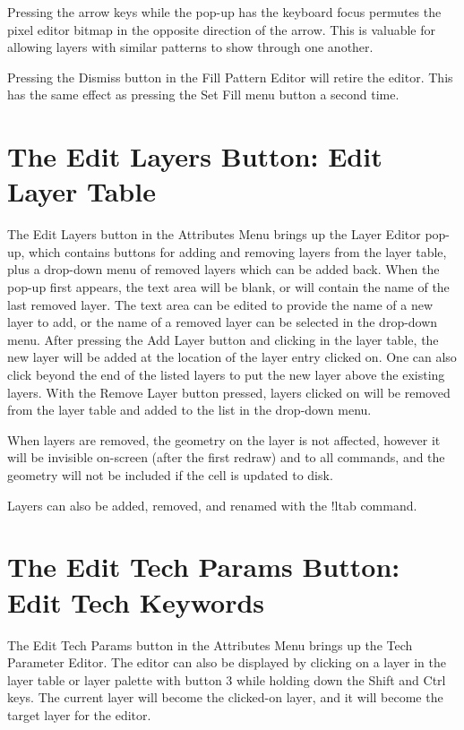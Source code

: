 Pressing the arrow keys while the pop-up has the keyboard focus
permutes the pixel editor bitmap in the opposite direction of the
arrow.  This is valuable for allowing layers with similar patterns to
show through one another.

Pressing the {\cb Dismiss} button in the {\cb Fill Pattern Editor}
will retire the editor.  This has the same effect as pressing the {\cb
Set Fill} menu button a second time.


\section{The {\cb Edit Layers} Button: Edit Layer Table}
The {\cb Edit Layers} button in the {\cb Attributes Menu} brings up
the {\cb Layer Editor} pop-up, which contains buttons for adding and
removing layers from the layer table, plus a drop-down menu of removed
layers which can be added back.  When the pop-up first appears, the
text area will be blank, or will contain the name of the last removed
layer.  The text area can be edited to provide the name of a new layer
to add, or the name of a removed layer can be selected in the
drop-down menu.  After pressing the {\cb Add Layer} button and
clicking in the layer table, the new layer will be added at the
location of the layer entry clicked on.  One can also click beyond the
end of the listed layers to put the new layer above the existing
layers.  With the {\cb Remove Layer} button pressed, layers clicked on
will be removed from the layer table and added to the list in the
drop-down menu.
 
When layers are removed, the geometry on the layer is not affected,
however it will be invisible on-screen (after the first redraw) and to
all commands, and the geometry will not be included if the cell is
updated to disk.
    
Layers can also be added, removed, and renamed with the {\cb !ltab}
command.


\section{The {\cb Edit Tech Params} Button: Edit Tech Keywords}

The {\cb Edit Tech Params} button in the {\cb Attributes Menu} brings
up the {\cb Tech Parameter Editor}.  The editor can also be displayed
by clicking on a layer in the layer table or layer palette with button
3 while holding down the {\kb Shift} and {\kb Ctrl} keys.  The current
layer will become the clicked-on layer, and it will become the target
layer for the editor.


